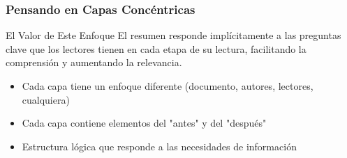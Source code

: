 \documentclass{beamer}
\begin{document}
\begin{frame}
\frametitle{Pensando en Capas Concéntricas}
\begin{block}{El Valor de Este Enfoque}
El resumen responde implícitamente a las preguntas clave que los lectores tienen en cada etapa de su lectura, facilitando la comprensión y aumentando la relevancia.
\end{block}


\vspace{0.2cm}
\begin{itemize}
    \item Cada capa tiene un enfoque diferente (documento, autores, lectores, cualquiera)
    \item Cada capa contiene elementos del "antes" y del "después"
    \item Estructura lógica que responde a las necesidades de información
\end{itemize}
\end{frame}
\end{document}
